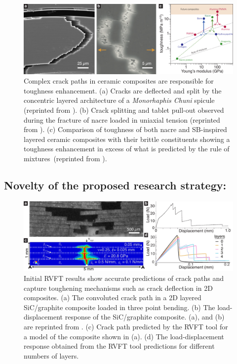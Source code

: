 \documentclass[10pt,letterpaper]{article}
\begin{document}
       \begin{figure}[t!]
         \centering
           \includegraphics[width=\textwidth, trim={0 0.0cm 0.0cm 0}, clip]{Figures/Introduction/CrackPath_V2.pdf}
           \caption{ \footnotesize Complex crack paths in ceramic composites are responsible for toughness enhancement. (a) Cracks are deflected and split by the concentric layered architecture of a \textit{Monorhaphis Chuni} spicule (reprinted from \cite{Weaver:2010ew}). (b) Crack splitting and tablet pull-out observed during the fracture of nacre loaded in uniaxial tension (reprinted from \cite{wegst2015bioinspired}). (c) Comparison of toughness of both nacre and SB-inspired layered ceramic composites with their brittle constituents showing a toughness enhancement in excess of what is predicted by the rule of mixtures~(reprinted from \cite{wegst2015bioinspired}).
             }
           \label{f:hyp}
       \end{figure}

   \subsection{Novelty of the proposed research strategy:}
    \label{s:nov}





    \begin{figure}[h!]
      \centering
        \includegraphics[width=\textwidth, trim={0 0.0cm 0.0cm 0}, clip]{Figures/Introduction/CrackPathSim_V1.pdf}
        \caption{ \footnotesize Initial RVFT results show accurate predictions of crack paths and capture toughening mechanisms such as crack deflection in 2D composites. (a) The convoluted crack path in a 2D layered SiC/graphite composite loaded in three point bending. (b) The load-displacement response of the SiC/graphite composite. (a), and (b) are reprinted from \cite{clegg1990simple}. (c) Crack path predicted by the RVFT tool for a model of the composite shown in (a). (d) The load-displacement response obtained from the RVFT tool predictions for different numbers of layers.
          }
        \label{f:sim}
    \end{figure}
\end{document}
